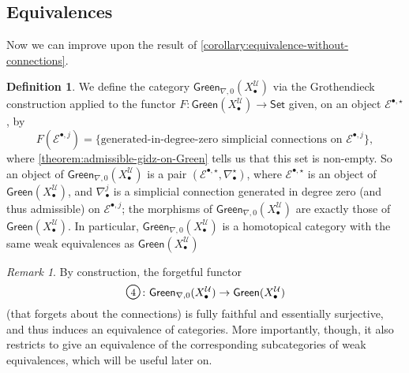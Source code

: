 \documentclass[11pt,fleqn]{article}
\theoremstyle{plain}
\theoremstyle{definition}
\newtheorem{definition}[theorem]{Definition}
\theoremstyle{remark}
\newtheorem{remark}[theorem]{Remark}
\numberwithin{equation}{theorem}
\newcommand{\cover}{\mathcal{U}}
\newcommand{\anotherbullet}{\star}
\newcommand{\greenX}{\mathsf{Green}(X_\bullet^\cover)}
\newcommand{\greenzeroX}{\mathsf{Green}_{\nabla,0}(X_\bullet^\cover)}
\newcommand{\numberincircle}[1]{\text{\normalfont\Large\textcircled{\small #1}}}
\begin{document}
    \subsection{Equivalences}

        Now we can improve upon the result of \cref{corollary:equivalence-without-connections}.

        \begin{definition}\label{definition:cartvectzeroX-and-greenzeroX}
            We define the category $\greenzeroX$ via the Grothendieck construction applied to the functor $F\colon\greenX\to\mathsf{Set}$ given, on an object $\mathcal{E}^{\bullet,\anotherbullet}$, by
            \[
                F(\mathcal{E}^{\bullet,j}) = \big\{ \mbox{generated-in-degree-zero simplicial connections on $\mathcal{E}^{\bullet,j}$} \big\},
            \]
            where \cref{theorem:admissible-gidz-on-Green} tells us that this set is non-empty.
            So an object of $\greenzeroX$ is a pair $(\mathcal{E}^{\bullet,\anotherbullet},\nabla_\bullet^\anotherbullet)$, where $\mathcal{E}^{\bullet,\anotherbullet}$ is an object of $\greenX$, and $\nabla_\bullet^j$ is a simplicial connection generated in degree zero (and thus admissible) on $\mathcal{E}^{\bullet,j}$; the morphisms of $\greenzeroX$ are exactly those of $\greenX$.
            In particular, $\greenzeroX$ is a homotopical category with the same weak equivalences as $\greenX$
        \end{definition}

        \begin{remark}\label{remark:4-is-an-equivalence-of-1-cats}
            By construction, the forgetful functor
            \[
                \numberincircle{4}\colon
                \greenzeroX \to \greenX
            \]
            (that forgets about the connections) is fully faithful and essentially surjective, and thus induces an equivalence of categories.
            More importantly, though, it also restricts to give an equivalence of the corresponding subcategories of weak equivalences, which will be useful later on.
        \end{remark}
\end{document}
